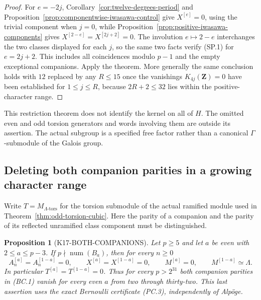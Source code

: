 \documentclass[11pt,a4paper]{article}
\newtheorem{proposition}[theorem]{Proposition}
\theoremstyle{definition}
\begin{document}
\begin{proof}
For $e=-2j$, Corollary~\ref{cor:twelve-degrees-period} and
Proposition~\ref{prop:componentwise-iwasawa-control} give
$X^{[e]}=0$, using the trivial component when $j=0$, while
Proposition~\ref{prop:positive-iwasawa-components} gives
$X^{[2-e]}=X^{[2j+2]}=0$. The involution $e\mapsto2-e$
interchanges the two classes displayed for each $j$, so the
same two facts verify (SP.1) for $e=2j+2$. This includes all
coincidences modulo $p-1$ and the empty exceptional companions.
Apply the theorem. More generally the same conclusion holds
with $12$ replaced by any $R\leq15$ once the vanishings
$K_{4j}(\mathbf Z)=0$ have been established for $1\leq j\leq R$,
because $2R+2\leq32$ lies within the positive-character range.
\end{proof}

This restriction theorem does not identify the kernel on all of
$H$. The omitted even and odd torsion generators and words
involving them are outside its assertion. The actual subgroup
is a specified free factor rather than a canonical
$\Gamma$-submodule of the Galois group.

\subsection{Deleting both companion parities in a growing character range}
\label{sec:growing-component-window}

Write $T=M_{\Lambda\text{-tors}}$ for the torsion submodule of the
actual ramified module used in Theorem~\ref{thm:odd-torsion-cubic}.
Here the parity of a companion and the parity of its reflected
unramified class component must be distinguished.

\begin{proposition}[K17-BOTH-COMPANIONS]
\label{prop:both-companions}
Let $p\geq5$ and let $a$ be even with $2\leq a\leq p-3$.
If $p\nmid\operatorname{num}(B_a)$, then for every $n\geq0$
\[
 A_n^{[a]}=A_n^{[1-a]}=0,\qquad
 X^{[a]}=X^{[1-a]}=0,\qquad
 M^{[a]}=0,\qquad M^{[1-a]}\simeq\Lambda.
 \tag{BC.1}
\]
In particular $T^{[a]}=T^{[1-a]}=0$. Thus for every
$p>2^{31}$ both companion parities in (BC.1) vanish for every
even $a$ from two through thirty-two. This last assertion uses
the exact Bernoulli certificate (PC.3), independently of Alp\"oge.
\end{proposition}
\end{document}
